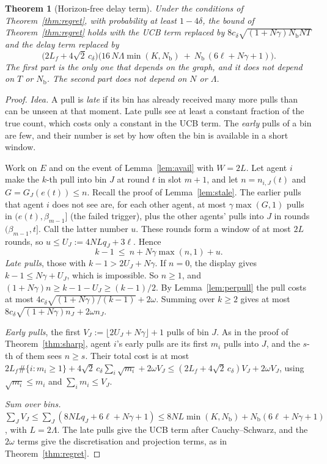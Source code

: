 \documentclass[11pt]{article}
\newtheorem{theorem}{Theorem}
\theoremstyle{definition}
\newcommand{\Nb}{N_{\mathrm b}}
\begin{document}
\begin{theorem}[Horizon-free delay term]\label{thm:hfree}
Under the conditions of Theorem~\ref{thm:regret}, with probability at least $1-4\delta$, the bound of
Theorem~\ref{thm:regret} holds with the UCB term replaced by $8c_\delta\sqrt{(1+N\gamma)\Nb NT}$ and the delay term
replaced by
\[
\big(2L_f+4\sqrt2\,c_\delta\big)\Big(16\,N\Lambda\min(K,\Nb)\ +\ \Nb\,(6\ell+N\gamma+1)\Big).
\]
The first part is the only one that depends on the graph, and it does not depend on $T$ or $\Nb$. The second part does
not depend on $N$ or $\Lambda$.
\end{theorem}
\begin{proof}
\emph{Idea.} A pull is \emph{late} if its bin has already received many more pulls than can be unseen at that moment.
Late pulls see at least a constant fraction of the true count, which costs only a constant in the UCB term. The
\emph{early} pulls of a bin are few, and their number is set by how often the bin is available in a short window.

Work on $E$ and on the event of Lemma~\ref{lem:avail} with $W=2L$. Let agent $i$ make the $k$-th pull into bin $J$ at round
$t$ in slot $m+1$, and let $n=n_{i,J}(t)$ and $G=G_J(e(t))\le n$. Recall the proof of Lemma~\ref{lem:stale}. The earlier
pulls that agent $i$ does not see are, for each other agent, at most $\gamma\max(G,1)$ pulls in $(e(t),\beta_{m-1}]$
(the failed trigger), plus the other agents' pulls into $J$ in rounds $(\beta_{m-1},t]$. Call the latter number $u$. These
rounds form a window of at most $2L$ rounds, so $u\le U_J:=4NLq_J+3\ell$. Hence
\[
k-1\ \le\ n+N\gamma\max(n,1)+u .
\]
\emph{Late pulls}, those with $k-1>2U_J+N\gamma$. If $n=0$, the display gives $k-1\le N\gamma+U_J$, which is impossible.
So $n\ge1$, and $(1+N\gamma)n\ge k-1-U_J\ge(k-1)/2$. By Lemma~\ref{lem:perpull} the pull costs at most
$4c_\delta\sqrt{(1+N\gamma)/(k-1)}+2\omega$. Summing over $k\ge2$ gives at most $8c_\delta\sqrt{(1+N\gamma)n_J}+2\omega n_J$.

\emph{Early pulls}, the first $V_J:=\lfloor2U_J+N\gamma\rfloor+1$ pulls of bin $J$. As in the proof of
Theorem~\ref{thm:sharp}, agent $i$'s early pulls are its first $m_i$ pulls into $J$, and the $s$-th of them sees $n\ge s$.
Their total cost is at most $2L_f\#\{i:m_i\ge1\}+4\sqrt2\,c_\delta\sum_i\sqrt{m_i}+2\omega V_J\le(2L_f+4\sqrt2\,c_\delta)V_J+2\omega V_J$,
using $\sqrt{m_i}\le m_i$ and $\sum_im_i\le V_J$.

\emph{Sum over bins.} $\sum_JV_J\le\sum_J(8NLq_J+6\ell+N\gamma+1)\le8NL\min(K,\Nb)+\Nb(6\ell+N\gamma+1)$, with $L=2\Lambda$.
The late pulls give the UCB term after Cauchy--Schwarz, and the $2\omega$ terms give the discretisation and projection
terms, as in Theorem~\ref{thm:regret}.
\end{proof}
\end{document}

